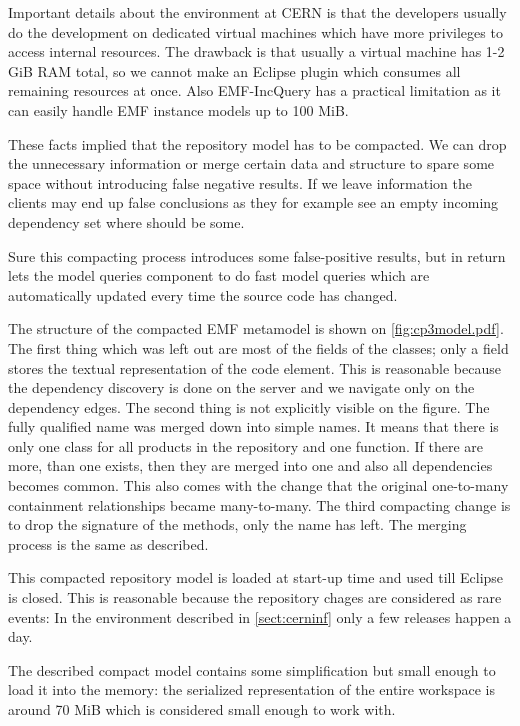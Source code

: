 Important details about the environment at CERN is that the developers usually
do the development on dedicated virtual machines which have more privileges to
access internal resources. The drawback is that usually a virtual machine has
1-2 GiB RAM total, so we cannot make an Eclipse plugin which consumes all
remaining resources at once. Also EMF-IncQuery has a practical limitation as it
can easily handle EMF instance models up to 100 MiB.

These facts implied that the repository model has to be compacted. We can drop
the unnecessary information or merge certain data and structure to spare some
space without introducing false negative results. If we leave information the
clients may end up false conclusions as they for example see an empty incoming
dependency set where should be some. 

Sure this compacting process introduces some false-positive results, but in 
return lets the model queries component to do fast model queries which
are automatically updated every time the source code has changed. 

The structure of the compacted EMF metamodel is shown on \autoref{fig:cp3model.pdf}.
The first thing which was left out are most of the fields of the classes; only a
 field stores the textual representation of the code element. This is
reasonable because the dependency discovery is done on the server and we
navigate only on the dependency edges. The second thing is not explicitly
visible on the figure. The fully qualified name was merged down into simple
names. It means that there is only one  class for all products in
the repository and one  function. If there are more, than one
exists, then they are merged into one and also all dependencies becomes common. This
also comes with the change that the original one-to-many containment
relationships became many-to-many. The third compacting change is to drop the
signature of the methods, only the name has left. The merging process is the
same as described.

This compacted repository model is loaded at start-up time and used till Eclipse
is closed. This is reasonable because the repository chages are considered as rare events: 
In the environment described in \autoref{sect:cerninf} only a few releases happen a day.

The described compact model contains some simplification but small enough to
load it into the memory: the serialized representation of the entire workspace is
around 70 MiB which is considered small enough to work with. 

